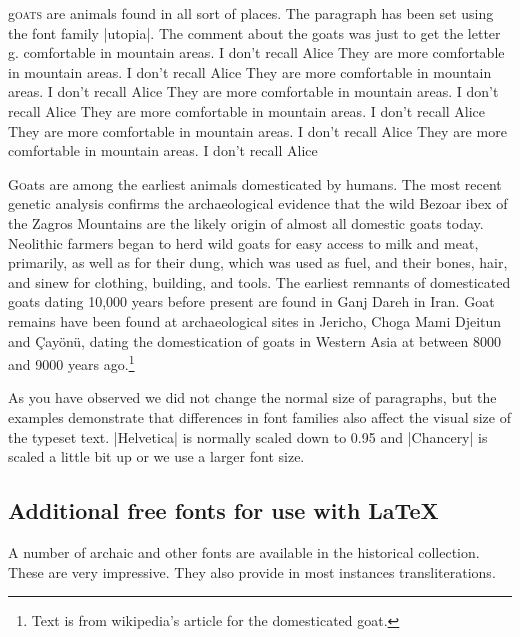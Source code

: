 \renewcommand{\LettrineFontHook}{\fontfamily{phv}\fontseries{bx}}%



\par\leavevmode

\lettrine[lines=5, lhang=0.1,lraise=0.28,findent=1pt]{g}{oats} are animals found in all sort of places. The paragraph has been set using the font family |utopia|. The comment about the goats was just to get the letter g.
comfortable in mountain areas. I don't recall Alice  They are more
comfortable in mountain areas. I don't recall Alice   They are more
comfortable in mountain areas. I don't recall Alice   They are more
comfortable in mountain areas. I don't recall Alice  They are more
comfortable in mountain areas. I don't recall Alice  They are more
comfortable in mountain areas. I don't recall Alice  They are more
comfortable in mountain areas. I don't recall Alice 

\medskip



\lettrine{G}{o}ats are among the earliest animals domesticated by humans. The most recent genetic analysis confirms the archaeological evidence that the wild Bezoar ibex of the Zagros Mountains are the likely origin of almost all domestic goats today. Neolithic farmers began to herd wild goats for easy access to milk and meat, primarily, as well as for their dung, which was used as fuel, and their bones, hair, and sinew for clothing, building, and tools. The earliest remnants of domesticated goats dating 10,000 years before present are found in Ganj Dareh in Iran. Goat remains have been found at archaeological sites in Jericho, Choga Mami Djeitun and Çay\"on\"u, dating the domestication of goats in Western Asia at between 8000 and 9000 years ago.\footnote{Text is from wikipedia's article for the domesticated goat.}

As you have observed we did not change the normal size of paragraphs, but the examples demonstrate that differences in font families also affect the visual size of the typeset text. |Helvetica| is normally scaled down to 0.95 and |Chancery| is scaled a little bit up or we use a larger font size.




\subsection{Additional free fonts for use with \LaTeX}

A number of archaic and other fonts are available in the \latexe historical collection. These are very impressive. They also provide in most instances transliterations.

